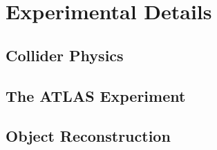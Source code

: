 \chapter{Experimental Details}

\section{Collider Physics}

\section{The ATLAS Experiment}

\section{Object Reconstruction}